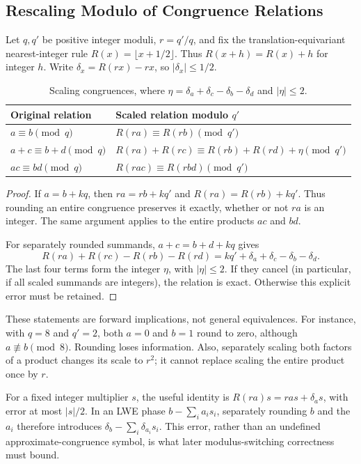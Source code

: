 
\subsection{Rescaling Modulo of Congruence Relations}
\label{subsec:modulo-rescaling}

Let $q,q'$ be positive integer moduli, $r=q'/q$, and fix the translation-equivariant nearest-integer rule $R(x)=\lfloor x+1/2\rfloor$. Thus $R(x+h)=R(x)+h$ for integer $h$. Write $\delta_x=R(rx)-rx$, so $|\delta_x|\le1/2$.

\begin{table}[h!]
\centering
\begin{tabular}{|l|l|}
\hline
Original relation & Scaled relation modulo $q'$ \\
\hline
$a\equiv b\pmod q$ & $R(ra)\equiv R(rb)\pmod{q'}$ \\
$a+c\equiv b+d\pmod q$ & $R(ra)+R(rc)\equiv R(rb)+R(rd)+\eta\pmod{q'}$ \\
$ac\equiv bd\pmod q$ & $R(rac)\equiv R(rbd)\pmod{q'}$ \\
\hline
\end{tabular}
\caption{Scaling congruences, where $\eta=\delta_a+\delta_c-\delta_b-\delta_d$ and $|\eta|\le2$.}
\label{tab:rescaling}
\end{table}

\begin{proof}
If $a=b+kq$, then $ra=rb+kq'$ and $R(ra)=R(rb)+kq'$. Thus rounding an entire congruence preserves it exactly, whether or not $ra$ is an integer. The same argument applies to the entire products $ac$ and $bd$.

For separately rounded summands, $a+c=b+d+kq$ gives
\[
R(ra)+R(rc)-R(rb)-R(rd)=kq'+\delta_a+\delta_c-\delta_b-\delta_d.
\]
The last four terms form the integer $\eta$, with $|\eta|\le2$. If they cancel (in particular, if all scaled summands are integers), the relation is exact. Otherwise this explicit error must be retained.
\end{proof}

These statements are forward implications, not general equivalences. For instance, with $q=8$ and $q'=2$, both $a=0$ and $b=1$ round to zero, although $a\not\equiv b\pmod8$. Rounding loses information. Also, separately scaling both factors of a product changes its scale to $r^2$; it cannot replace scaling the entire product once by $r$.

For a fixed integer multiplier $s$, the useful identity is $R(ra)s=ras+\delta_a s$, with error at most $|s|/2$. In an LWE phase $b-\sum_i a_i s_i$, separately rounding $b$ and the $a_i$ therefore introduces $\delta_b-\sum_i\delta_{a_i}s_i$. This error, rather than an undefined approximate-congruence symbol, is what later modulus-switching correctness must bound.


